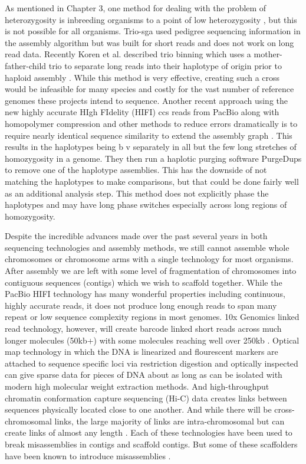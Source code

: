 \par{
As mentioned in Chapter 3, one method for dealing with the problem of heterozygosity is inbreeding organisms to a point of low heterozygosity \cite{drosophila}, 
but this is not possible for all organisms. Trio-sga used pedigree sequencing information in the assembly algorithm \cite{trio-sga} 
but was built for short reads and does not work on long read data. Recently Koren et al. described trio binning which uses a mother-father-child trio to 
separate long reads into their haplotype of origin prior to haploid assembly \cite{triobinning}. 
While this method is very effective, creating such a cross would be infeasible for many species and costly for the vast number of reference genomes these projects intend to sequence. 
Another recent approach using the new highly accurate HIgh FIdelity (HIFI) ccs reads from PacBio along with homopolymer compression and other methods to reduce errors dramatically is to 
require nearly identical sequence similarity to extend the assembly graph \cite{HICANU}. This results in the haplotypes being b v separately in all but the few long stretches of homozygosity in 
a genome. They then run a haplotic purging software PurgeDups \cite{purgedups} to remove one of the haplotype assemblies. This has the downside of not matching the haplotypes to make comparisons, but that could be done 
fairly well as an additional analysis step. This method does not explicitly phase the haplotypes and may have long phase switches especially across long regions of homozygosity.
}

\par{
Despite the incredible advances made over the past several years in both sequencing technologies and assembly methods, we still cannot assemble whole chromosomes or chromosome arms with a 
single technology for most organisms. After assembly we are left with some level of fragmentation of chromosomes into contiguous sequences (contigs) which we wish to scaffold together. While the 
PacBio HIFI technology has many wonderful properties including continuous, highly accurate reads, it does not produce long enough reads to span many repeat or low sequence complexity regions in most genomes.
 10x Genomics linked read technology, however, will create barcode linked short reads across much longer molecules (50kb+) with some molecules reaching well over 250kb \cite{10xlinked}. Optical map technology in which the DNA is linearized and flourescent markers are attached to sequence specific loci via restriction digestion and optically inspected can give sparse data for pieces of DNA about as long as can be isolated with modern high molecular weight extraction methods\cite{opticalmaps1}. And high-throughput chromatin conformation capture sequencing (Hi-C) data creates links between sequences physically located close to one another. And while there will be cross-chromosomal links, the large majority of links are intra-chromosomal but can create links of almost any length \cite{3CHIC} \cite{HIC}. Each of these technologies have been used to break misassemblies in contigs and scaffold contigs\cite{scaff10x}\cite{opticalhuman}\cite{hicscafffirst}\cite{SALSA}\cite{GRAAL}\cite{instaGRAAL}. But some of these scaffolders have been known to introduce misassemblies \cite{hicscafffirst}. 
}


